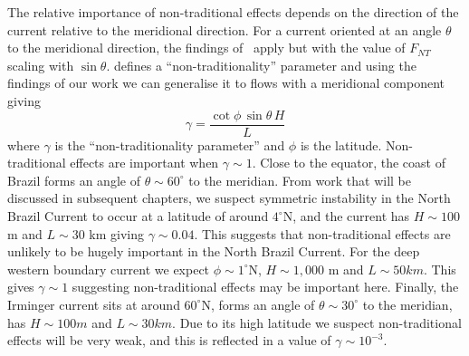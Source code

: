     The relative importance of non-traditional effects depends on the direction of the current relative to the meridional direction. For a current oriented at an angle $\theta$ to the meridional direction, the findings of~\citet{Zeitlin2018a} apply but with the value of $F_{NT}$ scaling with $\sin \theta$. \citet{Zeitlin2018a} defines a ``non-traditionality'' parameter and using the findings of our work we can generalise it to flows with a meridional component giving
    \begin{equation}
        \gamma = \frac{\cot\phi\,\sin \theta\,H}{L}
    \end{equation}
    where $\gamma$ is the  ``non-traditionality parameter'' and $\phi$ is the latitude. Non-traditional effects are important when $\gamma \sim 1$. Close to the equator, the coast of Brazil forms an angle of $\theta \sim 60^\circ$ to the meridian. From work that will be discussed in subsequent chapters, we suspect symmetric instability in the North Brazil Current to occur at a latitude of around $4^\circ$N, and the current has $H\sim100$ m and $L\sim30$ km giving $\gamma \sim 0.04$. This suggests that non-traditional effects are unlikely to be hugely important in the North Brazil Current. For the deep western boundary current we expect $\phi \sim 1^\circ$N, $H\sim 1,000$ m and $L \sim 50 km$. This gives $\gamma \sim 1$ suggesting non-traditional effects may be important here. Finally, the Irminger current sits at around $60^\circ$N, forms an angle of $\theta \sim 30^\circ$ to the meridian, has $H \sim 100 m$ and $L \sim 30 km$. Due to its high latitude we suspect non-traditional effects will be very weak, and this is reflected in a value of $\gamma \sim 10^{-3}$.